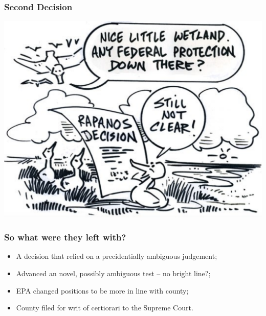 \documentclass[aspectratio=169]{beamer}
\theoremstyle{principle}
\begin{document}
\begin{frame}
\frametitle{Second Decision}

    \begin{center}
     \includegraphics[scale=0.28]{rapanos.png}
     \end{center}

\end{frame}

\begin{frame}
\frametitle{So what were they left with?}

\begin{itemize}
\item A decision that relied on a precidentially ambiguous judgement;
\bigskip
\bigskip
\item Advanced an novel, possibly ambiguous test -- no bright line?;
\bigskip
\bigskip
\item EPA changed positions to be more in line with county;
\bigskip
\bigskip
\item County filed for writ of certiorari to the Supreme Court.
\end{itemize}
\end{frame}
\end{document}
